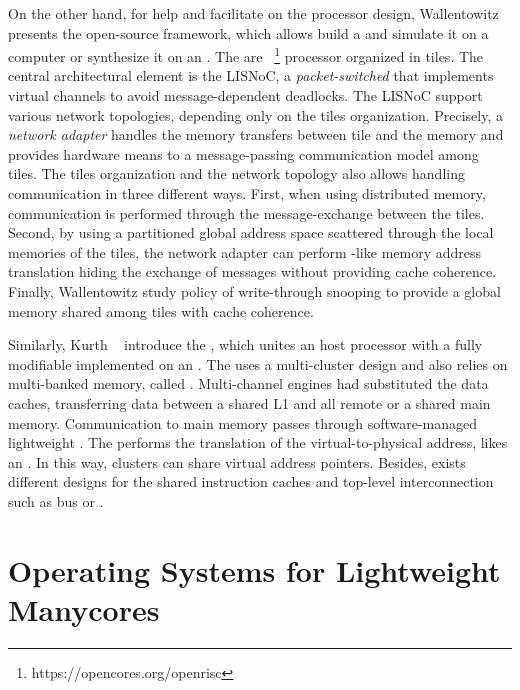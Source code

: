 	On the other hand, for help and facilitate on the \manycore processor design,
	Wallentowitz \etal~\cite{Wallentowitz2013} presents the open-source \optimsoc
	framework, which allows build a
		\manycore \soc {}
	and simulate it on a computer or
	synthesize it on an \fpga.
	The \pe are \openrisc~\footnote{https://opencores.org/openrisc}
	processor organized in tiles.
	The central architectural element is the LISNoC, a \textit{packet-switched \noc}
	that implements virtual channels to avoid message-dependent deadlocks.
	The LISNoC support various network topologies, depending only on the tiles organization.
	Precisely, a \textit{network adapter} handles the memory transfers between
	tile and the memory and provides hardware means to a message-passing communication
	model among tiles.
	The tiles organization and the network topology also allows handling communication
	in three different ways.
	First, when using distributed memory, communication is performed through the
	message-exchange between the tiles.
	Second, by using a partitioned global address space scattered through the
	local memories of the tiles, the network adapter can perform \mpu-like memory
	address translation hiding the exchange of messages without providing cache coherence.
	Finally, Wallentowitz \etal study policy of write-through snooping to provide
	a global memory shared among tiles with cache coherence.

	Similarly, Kurth \etal~\cite{Kurth2017} introduce the \hero, which unites an \arm
	host processor with a fully modifiable \riscv \manycore implemented on an \fpga.
	The \pmca uses a multi-cluster design and also relies on multi-banked memory, called \spm.
	Multi-channel \dma engines had substituted the data caches, transferring data between
	a shared L1 \spm and all remote \spms or a shared main memory.
	Communication to main memory passes through software-managed lightweight \rab.
	The \rab performs the translation of the virtual-to-physical address, likes an \mmu.
	In this way, clusters can share virtual address pointers.
	Besides, exists different designs for the shared instruction caches and
	top-level interconnection such as bus or \noc.

\section{Operating Systems for Lightweight Manycores}
\label{sec.works.os}

